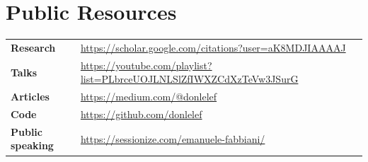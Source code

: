 \documentclass[10pt,a4paper]{article}
\begin{document}
\section*{Public Resources}
\begin{tabularx}{\textwidth}{>{\bfseries}p{2.5cm}X}
Research & \url{https://scholar.google.com/citations?user=aK8MDJIAAAAJ}\\
Talks & \url{https://youtube.com/playlist?list=PLbrceUOJLNLSlZfIWXZCdXzTeVw3JSurG}\\
Articles & \url{https://medium.com/@donlelef}\\
Code & \url{https://github.com/donlelef}\\
Public speaking & \url{https://sessionize.com/emanuele-fabbiani/}
\end{tabularx}
\end{document}
